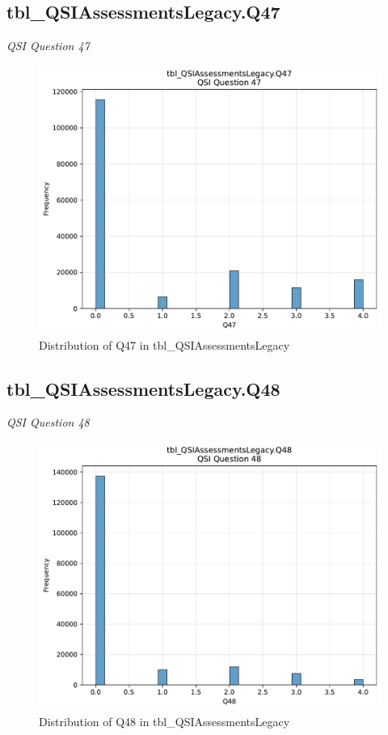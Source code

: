 \subsection{tbl\_QSIAssessmentsLegacy.Q47}
\textit{QSI Question 47}

\begin{figure}[htbp]
\centering
\includegraphics[width=\textwidth]{figures/dbo_tbl_QSIAssessmentsLegacy_Q47.pdf}
\caption{Distribution of Q47 in tbl\_QSIAssessmentsLegacy}
\end{figure}\newpage

\subsection{tbl\_QSIAssessmentsLegacy.Q48}
\textit{QSI Question 48}

\begin{figure}[htbp]
\centering
\includegraphics[width=\textwidth]{figures/dbo_tbl_QSIAssessmentsLegacy_Q48.pdf}
\caption{Distribution of Q48 in tbl\_QSIAssessmentsLegacy}
\end{figure}\newpage

